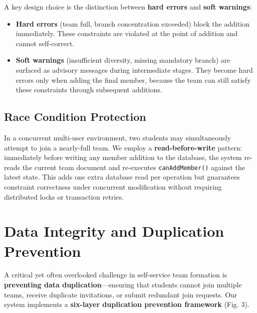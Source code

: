 \documentclass[12pt,a4paper]{article}
\begin{document}
A key design choice is the distinction between \textbf{hard errors} and \textbf{soft warnings}:

\begin{itemize}[noitemsep,topsep=3pt]
    \item \textbf{Hard errors} (team full, branch concentration exceeded) block the addition immediately. These constraints are violated at the point of addition and cannot self-correct.
    \item \textbf{Soft warnings} (insufficient diversity, missing mandatory branch) are surfaced as advisory messages during intermediate stages. They become hard errors only when adding the final member, because the team can still satisfy these constraints through subsequent additions.
\end{itemize}

\subsection{Race Condition Protection}

In a concurrent multi-user environment, two students may simultaneously attempt to join a nearly-full team. We employ a \textbf{read-before-write} pattern: immediately before writing any member addition to the database, the system re-reads the current team document and re-executes \texttt{canAddMember()} against the latest state. This adds one extra database read per operation but guarantees constraint correctness under concurrent modification without requiring distributed locks or transaction retries.

\section{Data Integrity and Duplication Prevention}

A critical yet often overlooked challenge in self-service team formation is \textbf{preventing data duplication}---ensuring that students cannot join multiple teams, receive duplicate invitations, or submit redundant join requests. Our system implements a \textbf{six-layer duplication prevention framework} (Fig. 3).
\end{document}
